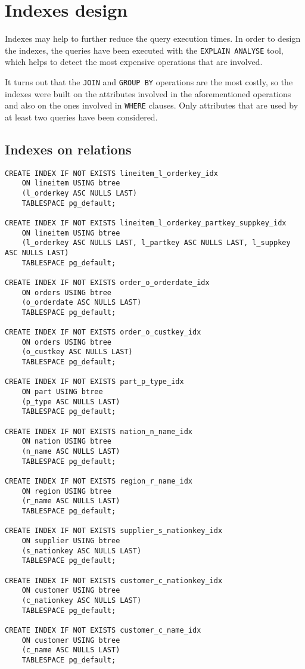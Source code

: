 

\section{Indexes design}

Indexes may help to further reduce the query execution times. In order to design the indexes, the queries have been executed with the \texttt{EXPLAIN ANALYSE} tool, which helps to detect the most expensive operations that are involved.

It turns out that the \texttt{JOIN} and \texttt{GROUP BY} operations are the most costly, so the indexes were built on the attributes involved in the aforementioned operations and also on the ones involved in \texttt{WHERE} clauses. Only attributes that are used by at least two queries have been considered.

\subsection{Indexes on relations}

\begin{lstlisting}
CREATE INDEX IF NOT EXISTS lineitem_l_orderkey_idx
    ON lineitem USING btree
    (l_orderkey ASC NULLS LAST)
    TABLESPACE pg_default;

CREATE INDEX IF NOT EXISTS lineitem_l_orderkey_partkey_suppkey_idx
    ON lineitem USING btree
    (l_orderkey ASC NULLS LAST, l_partkey ASC NULLS LAST, l_suppkey ASC NULLS LAST)
    TABLESPACE pg_default;

CREATE INDEX IF NOT EXISTS order_o_orderdate_idx
    ON orders USING btree
    (o_orderdate ASC NULLS LAST)
    TABLESPACE pg_default;

CREATE INDEX IF NOT EXISTS order_o_custkey_idx
    ON orders USING btree
    (o_custkey ASC NULLS LAST)
    TABLESPACE pg_default;

CREATE INDEX IF NOT EXISTS part_p_type_idx
	ON part USING btree
	(p_type ASC NULLS LAST)
	TABLESPACE pg_default;

CREATE INDEX IF NOT EXISTS nation_n_name_idx
	ON nation USING btree
	(n_name ASC NULLS LAST)
	TABLESPACE pg_default;

CREATE INDEX IF NOT EXISTS region_r_name_idx
	ON region USING btree
	(r_name ASC NULLS LAST)
	TABLESPACE pg_default;

CREATE INDEX IF NOT EXISTS supplier_s_nationkey_idx
	ON supplier USING btree
	(s_nationkey ASC NULLS LAST)
	TABLESPACE pg_default;

CREATE INDEX IF NOT EXISTS customer_c_nationkey_idx
	ON customer USING btree
	(c_nationkey ASC NULLS LAST)
	TABLESPACE pg_default;

CREATE INDEX IF NOT EXISTS customer_c_name_idx
	ON customer USING btree
	(c_name ASC NULLS LAST)
	TABLESPACE pg_default;
\end{lstlisting}

